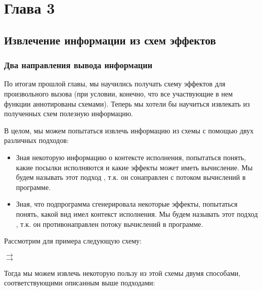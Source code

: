 \section{Глава 3}

\subsection{Извлечение информации из схем эффектов}

\subsubsection{Два направления вывода информации}

По итогам прошлой главы, мы научились получать схему эффектов для произвольного вызова (при условии, конечно, что все участвующие в нем функции аннотированы схемами). Теперь мы хотели бы научиться извлекать из полученных схем полезную информацию.

В целом, мы можем попытаться извлечь информацию из схемы с помощью двух различных подходов:

\begin{itemize}
    \item Зная некоторую информацию о контексте исполнения, попытаться понять, какие посылки исполняются и какие эффекты может иметь вычисление. Мы будем называть этот подход , т.к. он сонаправлен с потоком вычислений в программе.
    
    \item Зная, что подпрограмма сгенерировала некоторые эффекты, попытаться понять, какой вид имел контекст исполнения. Мы будем называть этот подход , т.к. он противонаправлен потоку вычислений в программе.
    
\end{itemize}

Рассмотрим для примера следующую схему:

{
     $\rightarrow$  \\
     $\rightarrow$ 
}{}

Тогда мы можем извлечь некоторую пользу из этой схемы двумя способами, соответствующими описанным выше подходами:

